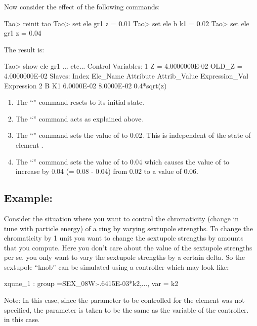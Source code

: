 \documentclass{hitec}     %
\begin{document}
{{{{Now consider the effect of the following commands:
\begin{code}
Tao> reinit tao
Tao> set ele gr1 z = 0.01
Tao> set ele b k1 = 0.02
Tao> set ele gr1 z = 0.04
\end{code}

The result is:

\begin{code}
Tao> show ele gr1
... etc...
Control Variables:
    1   Z  =  4.0000000E-02           OLD_Z  =  4.0000000E-02
Slaves:
   Index   Ele_Name  Attribute   Attrib_Value  Expression_Val    Expression
       2   B         K1            6.0000E-02      8.0000E-02    0.4*sqrt(z)
\end{code}
\vspace{-5 pt}
\begin{enumerate}
\item
The ``'' command resets \tao to its initial state.
\item
The ``'' command acts as explained above.
\item
The ``'' command sets the value of  to 0.02. This is independent of the state of element .
\item
The ``'' command sets the value of  to 0.04 which causes the
value of  to increase by 0.04 (= 0.08 - 0.04) from 0.02 to a value of 0.06.
\end{enumerate}

\subsection{Example:}
Consider the situation where you want to control the
chromaticity (change in tune with particle energy) of a ring by varying sextupole strengths. To
change the chromaticity by 1 unit you want to change the sextupole strengths by amounts that you
compute. Here you don't care about the value of the sextupole strengths per se, you only want to vary the
sextupole strengths by a certain delta. So the sextupole ``knob'' can be simulated using a 
controller which may look like:
\begin{code} 
xqune_1 : group ={SEX_08W:-.6415E-03*k2,...}, var = {k2}
\end{code}
Note: In this case, since the parameter to be controlled for the  element was not specified,
the parameter is taken to be the same as the variable of the controller.  in this case.

}}}}
\end{document}
